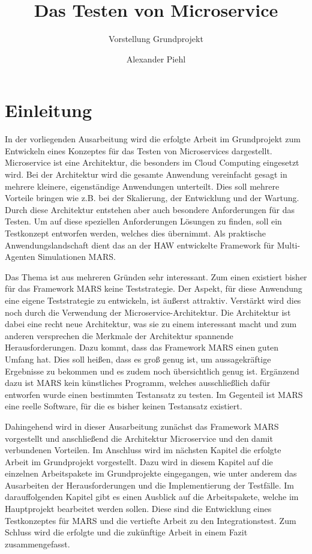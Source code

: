 \documentclass{llncs}
\title{Das Testen von Microservice}
\subtitle{Vorstellung Grundprojekt}
\author{Alexander Piehl\\\email{alexander.piehl@haw-hamburg.de}
\institute{Hamburg University of Applied Sciences (HAW),\\Dept. Computer Science, \\ Berliner Tor 7\\ 20099 Hamburg, Germany\\}}
\begin{document}
\maketitle

\section{Einleitung}
\nocite{*} In der vorliegenden Ausarbeitung wird die erfolgte Arbeit im Grundprojekt zum Entwickeln eines Konzeptes für das Testen von Microservices \cite{fowler2014} dargestellt. Microservice ist eine Architektur, die besonders im Cloud Computing eingesetzt wird. Bei der Architektur wird die gesamte Anwendung vereinfacht gesagt in mehrere kleinere, eigenständige Anwendungen unterteilt. Dies soll mehrere Vorteile bringen wie z.B. bei der Skalierung, der Entwicklung und der Wartung. Durch diese Architektur entstehen aber auch besondere Anforderungen für das Testen. Um auf diese speziellen Anforderungen Lösungen zu finden, soll ein Testkonzept entworfen werden, welches dies übernimmt. Als praktische Anwendungslandschaft dient das an der HAW entwickelte Framework für Multi-Agenten Simulationen MARS.

Das Thema ist aus mehreren Gründen sehr interessant. Zum einen existiert bisher für das Framework MARS keine Teststrategie. Der Aspekt, für diese Anwendung eine eigene Teststrategie zu entwickeln, ist äußerst attraktiv. Verstärkt wird dies noch durch die Verwendung der Microservice-Architektur. Die Architektur ist dabei eine recht neue Architektur, was sie zu einem interessant macht und zum anderen versprechen die Merkmale der Architektur spannende Herausforderungen. Dazu kommt, dass das Framework MARS einen guten Umfang hat. Dies soll heißen, dass es groß genug ist, um aussagekräftige Ergebnisse zu bekommen und es zudem noch übersichtlich genug ist. Ergänzend dazu ist MARS kein künstliches Programm, welches ausschließlich dafür entworfen wurde einen bestimmten Testansatz zu testen. Im Gegenteil ist MARS eine reelle Software, für die es bisher keinen Testansatz existiert.

Dahingehend wird in dieser Ausarbeitung zunächst das Framework MARS vorgestellt und anschließend die Architektur Microservice und den damit verbundenen Vorteilen. Im Anschluss wird im nächsten Kapitel die erfolgte Arbeit im Grundprojekt vorgestellt. Dazu wird in diesem Kapitel auf die einzelnen Arbeitspakete im Grundprojekte eingegangen, wie unter anderem das Ausarbeiten der Herausforderungen und die Implementierung der Testfälle. Im darauffolgenden Kapitel gibt es einen Ausblick auf die Arbeitspakete, welche im Hauptprojekt bearbeitet werden sollen. Diese sind die Entwicklung eines Testkonzeptes für MARS und die vertiefte Arbeit zu den Integrationstest. Zum Schluss wird die erfolgte und die zukünftige Arbeit in einem Fazit zusammengefasst.
\end{document}
